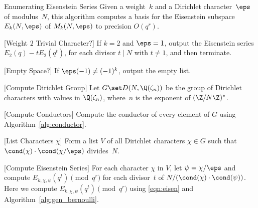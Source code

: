 \begin{algorithm}{Enumerating Eisenstein Series}\label{alg:enum_eisen}
  Given a weight~$k$ and a Dirichlet character~$\eps$ of modulus~$N$,
  this algorithm computes a basis for the Eisenstein
  subspace $E_k(N,\eps)$ of $M_k(N,\eps)$ to precision $O(q^r)$.
\begin{steps}
\item{}[Weight $2$ Trivial Character?] If $k=2$ and $\eps=1$, output the
  Eisenstein series $E_2(q) - tE_2(q^t)$, for each divisor $t\mid N$
  with $t\neq 1$, and then terminate.
\item{}[Empty Space?] If $\eps(-1)\neq (-1)^k$, output the empty list.
\item{}[Compute Dirichlet Group] Let $G\set D(N,\Q(\zeta_n))$ be the
  group of Dirichlet characters with values in $\Q(\zeta_n)$,
  where~$n$ is the exponent of $(\Z/N\Z)^*$.
\item{}[Compute Conductors]\label{step:enum_eisen3} Compute the
  conductor of every element of $G$ using
  Algorithm~\ref{alg:conductor}.
\item{}[List Characters $\chi$]\label{step:enum_eisen4} Form a list
  $V$ of all Dirichlet characters $\chi \in G$ such that
  $\cond(\chi)\cdot \cond(\chi/\eps)$ divides~$N$.
\item{}[Compute Eisenstein Series] For each character $\chi$ in $V$,
  let $\psi = \chi/\eps$ and compute $E_{k,\chi,\psi}(q^t)\pmod{q^r}$
  for each divisor~$t$ of $N/(\cond(\chi)\cdot \cond(\psi))$.  Here we
  compute $E_{k,\chi,\psi}(q^t) \pmod{q^r}$ using \eqref{eqn:eisen}
  and Algorithm~\ref{alg:gen_bernoulli}.

\end{steps}
\end{algorithm}

